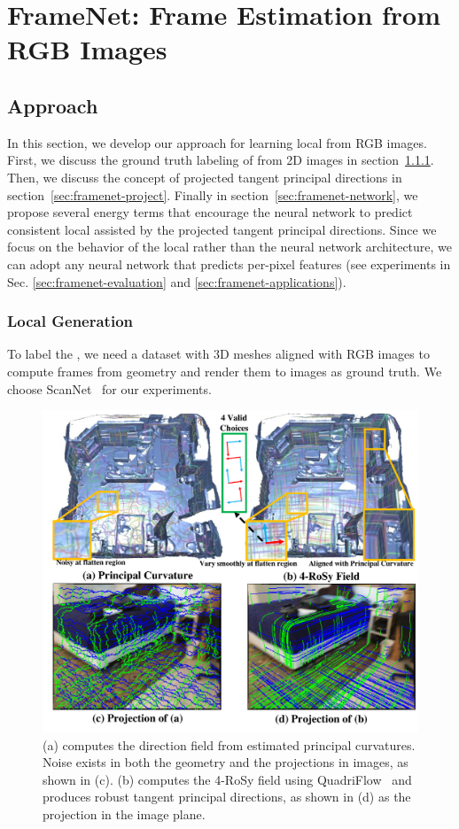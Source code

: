 \section{FrameNet: Frame Estimation from RGB Images}
\label{sec:framenet}
\subsection{Approach}
In this section, we develop our approach for learning local \cframe{} from RGB images. First, we discuss the ground truth labeling of \cframe{} from 2D images in section~\ref{sec:framenet-prepare-data}. Then, we discuss the concept of projected tangent principal directions in section~\ref{sec:framenet-project}. Finally in section~\ref{sec:framenet-network}, we propose several energy terms that encourage the neural network to predict consistent local \cframe{} assisted by the projected tangent principal directions. Since we focus on the behavior of the local \cframe{} rather than the neural network architecture, we can adopt any neural network that predicts per-pixel features (see experiments in Sec. \ref{sec:framenet-evaluation} and \ref{sec:framenet-applications}).

\subsubsection{Local \ccff{} Generation}
\label{sec:framenet-prepare-data}
To label the \cframe, we need a dataset with 3D meshes aligned with RGB images to compute frames from geometry and render them to images as ground truth. We choose ScanNet~\cite{dai2017scannet} for our experiments.

\begin{figure}
    \centering
    \includegraphics[width=0.8\linewidth,height=0.584\linewidth]{FrameNet/graph/4rosy.pdf}
    \vspace{-0.20in}
    \caption{(a) computes the direction field from estimated principal curvatures. Noise exists in both the geometry and the projections in images, as shown in (c). (b) computes the 4-RoSy field using QuadriFlow~\cite{huang2018quadriflow} and produces robust tangent principal directions, as shown in (d) as the projection in the image plane.}
    \label{fig:framenet-vis-geometry}
\vspace{-0.1in}
\end{figure}

